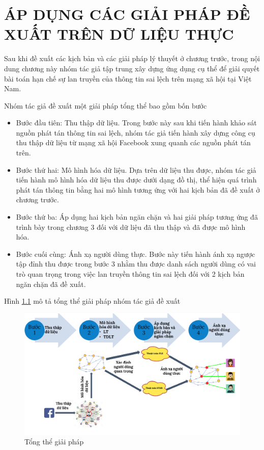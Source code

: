 \chapter{ÁP DỤNG CÁC GIẢI PHÁP ĐỀ XUẤT TRÊN DỮ LIỆU THỰC}
Sau khi đề xuất các kịch bản và các giải pháp lý thuyết ở chương trước, trong nội dung chương này nhóm tác giả tập trung xây dựng ứng dụng cụ thể để giải quyết bài toán hạn chế sự lan truyền của thông tin sai lệch trên mạng xã hội tại Việt Nam.

Nhóm tác giả đề xuất một giải pháp tổng thể bao gồm bốn bước
\begin{itemize}
	\item Bước đầu tiên: Thu thập dữ liệu. Trong bước này sau khi tiến hành khảo sát nguồn phát tán thông tin sai lệch, nhóm tác giả tiến hành xây dựng công cụ thu thập dữ liệu từ mạng xã hội Facebook xung quanh các nguồn phát tán trên.
	\item Bước thứ hai: Mô hình hóa dữ liệu. Dựa trên dữ liệu thu được, nhóm tác giả tiến hành mô hình hóa dữ liệu thu được dưới dạng đồ thị, thể hiện quá trình phát tán thông tin bằng hai mô hình tương ứng với hai kịch bản đã đề xuất ở chương trước.
	\item Bước thứ ba: Áp dụng hai kịch bản ngăn chặn và hai giải pháp tương ứng đã trình bày trong chương 3 đối với dữ liệu đã thu thập và đã được mô hình hóa.
	\item Bước cuối cùng: Ánh xạ người dùng thực. Bước này tiến hành ánh xạ ngược tập đỉnh thu được trong bước 3 nhằm thu được danh sách người dùng có vai trò quan trọng trong việc lan truyền thông tin sai lệch đối với 2 kịch bản ngăn chặn đã đề xuất.
\end{itemize}

Hình \ref{TongTheGiaiPhap} mô tả tổng thể giải pháp nhóm tác giả đề xuất
\begin{center}
	\begin{figure}[!htp]
		\begin{center}
			\includegraphics [scale=.3]{picture/TongTheGiaiPhap}
		\end{center}
		\caption{Tổng thể giải pháp}
		\label{TongTheGiaiPhap}
	\end{figure}
\end{center}

